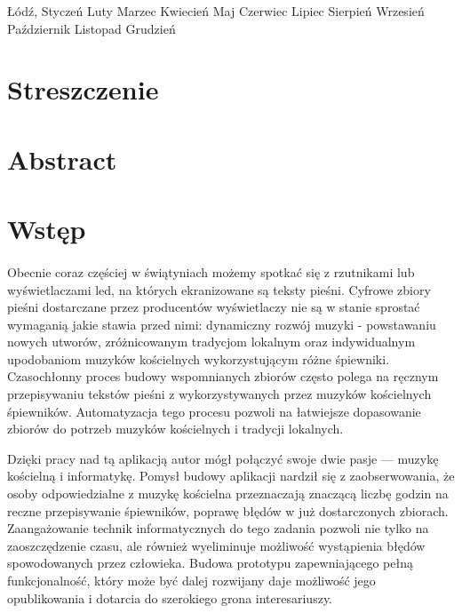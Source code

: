 \documentclass[a4paper,12pt]{article}
\newcommand{\MONTH}{%
  \ifcase\the\month
  \or Styczeń %
  \or Luty %
  \or Marzec %
  \or Kwiecień %
  \or Maj %
  \or Czerwiec %
  \or Lipiec %
  \or Sierpień %
  \or Wrzesień %
  \or Październik %
  \or Listopad %
  \or Grudzień %
  \fi}
\begin{document}
        \vspace*{90px}

        \fontsize{12pt}{0.2}\selectfont 
            \begin{center}Łódź, \MONTH \vspace{2cm}  \the\year \end{center} 
    \endgroup
    \newpage
	\setcounter{page}{2}
    \tableofcontents
	\newpage 

	\section*{Streszczenie}
	\section*{Abstract}
    
	\newpage 

	\section{Wstęp}
			\paragraph{\indent} Obecnie coraz częściej w świątyniach możemy spotkać się z rzutnikami lub wyświetlaczami led, na których ekranizowane są teksty pieśni.
				Cyfrowe zbiory pieśni dostarczane przez producentów wyświetlaczy nie są w stanie sprostać wymaganią jakie stawia przed nimi: dynamiczny rozwój muzyki - powstawaniu nowych utworów, zróżnicowanym tradycjom lokalnym oraz indywidualnym upodobaniom muzyków kościelnych wykorzystującym różne śpiewniki.
				Czasochłonny proces budowy wspomnianych zbiorów często
				polega na ręcznym przepisywaniu tekstów pieśni z wykorzystywanych przez muzyków kościelnych śpiewników.
				Automatyzacja tego procesu pozwoli na łatwiejsze dopasowanie zbiorów do potrzeb muzyków kościelnych i tradycji lokalnych. 
				\par Dzięki pracy nad tą aplikacją autor mógł połączyć swoje dwie pasje --- muzykę kościelną i informatykę. Pomysł budowy aplikacji nardził się z zaobserwowania, że osoby odpowiedzialne z muzykę kościelna przeznaczają znaczącą liczbę godzin na reczne przepisywanie śpiewników, poprawę błędów w już dostarczonych zbiorach. Zaangażowanie technik informatycznych do tego zadania pozwoli nie tylko na zaoszczędzenie czasu, ale również wyeliminuje możliwość wystąpienia błędów spowodowanych przez człowieka.
				Budowa prototypu zapewniającego pełną funkcjonalność, który może być dalej rozwijany daje możliwość jego opublikowania i dotarcia do szerokiego grona interesariuszy.  
\end{document}
